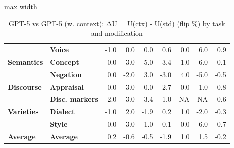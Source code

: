 \begin{table}[!tbp]
\begin{adjustbox}{max width=\linewidth}
\begin{tabular}{llrrrrrrr}
 & \textbf{Voice} & \cellcolor{green!2} -1.0 & 0.0 & 0.0 & \cellcolor{red!1} 0.6 & 0.0 & \cellcolor{red!12} 6.0 & \cellcolor{red!2} 0.9 \\
\textbf{Semantics} & \textbf{Concept} & 0.0 & \cellcolor{red!6} 3.0 & \cellcolor{green!10} -5.0 & \cellcolor{green!7} -3.4 & \cellcolor{green!2} -1.0 & \cellcolor{red!12} 6.0 & \cellcolor{green!0} -0.1 \\
 & \textbf{Negation} & 0.0 & \cellcolor{green!4} -2.0 & \cellcolor{red!6} 3.0 & \cellcolor{green!6} -3.0 & \cellcolor{red!8} 4.0 & \cellcolor{green!10} -5.0 & \cellcolor{green!1} -0.5 \\
\textbf{Discourse} & \textbf{Appraisal} & 0.0 & \cellcolor{green!6} -3.0 & 0.0 & \cellcolor{green!5} -2.7 & 0.0 & \cellcolor{red!2} 1.0 & \cellcolor{green!2} -0.8 \\
 & \textbf{Disc. markers} & \cellcolor{red!4} 2.0 & \cellcolor{red!6} 3.0 & \cellcolor{green!7} -3.4 & \cellcolor{red!2} 1.0 & NA & NA & \cellcolor{red!1} 0.6 \\
\textbf{Varieties} & \textbf{Dialect} & \cellcolor{green!2} -1.0 & \cellcolor{red!4} 2.0 & \cellcolor{green!4} -1.9 & \cellcolor{red!0} 0.2 & \cellcolor{red!2} 1.0 & \cellcolor{green!4} -2.0 & \cellcolor{green!1} -0.3 \\
 & \textbf{Style} & 0.0 & \cellcolor{green!6} -3.0 & \cellcolor{red!2} 1.0 & \cellcolor{red!0} 0.1 & 0.0 & \cellcolor{red!12} 6.0 & \cellcolor{red!1} 0.7 \\
 \midrule
\textbf{Average} & \textbf{Average} & \cellcolor{red!0} 0.2 & \cellcolor{green!1} -0.6 & \cellcolor{green!1} -0.5 & \cellcolor{green!4} -1.9 & \cellcolor{red!2} 1.0 & \cellcolor{red!3} 1.5 & \cellcolor{green!0} -0.2 \\
\bottomrule
\end{tabular}
\end{adjustbox}
\caption{GPT-5 vs GPT-5 (w. context): ΔU = U(ctx) - U(std) (flip \%) by task and modification}
\label{tab:gpt5_ctx_unrob}
\end{table}